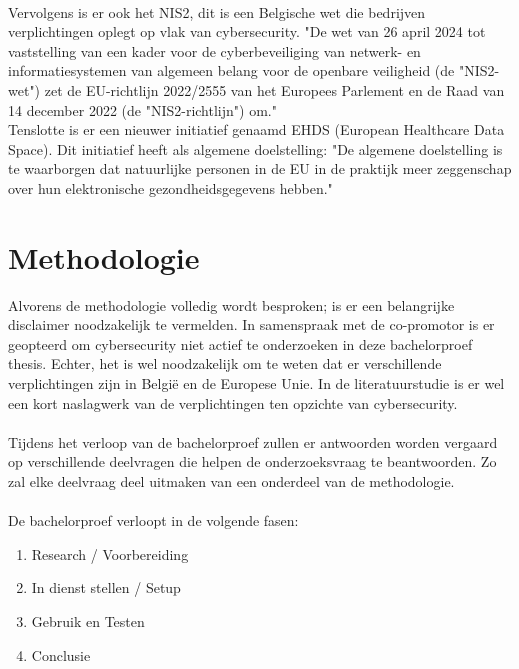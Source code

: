 \\
Vervolgens is er ook het NIS2, dit is een Belgische wet die bedrijven verplichtingen oplegt op vlak van cybersecurity. "De wet van 26 april 2024 tot vaststelling van een kader voor de cyberbeveiliging van netwerk- en informatiesystemen van algemeen belang voor de openbare veiligheid (de "NIS2-wet") zet de EU-richtlijn 2022/2555 van het Europees Parlement en de Raad van 14 december 2022 (de "NIS2-richtlijn") om." \autocite{Belgium2024}
\\
Tenslotte is er een nieuwer initiatief genaamd EHDS (European Healthcare Data Space). Dit initiatief heeft als algemene doelstelling: "De algemene doelstelling is te waarborgen dat natuurlijke personen in de EU in de praktijk meer zeggenschap over hun elektronische gezondheidsgegevens hebben." \autocite{EHDS2022}


\section{Methodologie}%
\label{sec:methodologie}

Alvorens de methodologie volledig wordt besproken; is er een belangrijke disclaimer noodzakelijk te vermelden.
In samenspraak met de co-promotor is er geopteerd om cybersecurity niet actief te onderzoeken in deze bachelorproef thesis. Echter, het is wel noodzakelijk om te weten dat er verschillende verplichtingen zijn in België en de Europese Unie. In de literatuurstudie is er wel een kort naslagwerk van de verplichtingen ten opzichte van cybersecurity.
\\\\
Tijdens het verloop van de bachelorproef zullen er antwoorden worden vergaard op verschillende deelvragen die helpen de onderzoeksvraag te beantwoorden. Zo zal elke deelvraag deel uitmaken van een onderdeel van de methodologie.
\\\\
De bachelorproef verloopt in de volgende fasen:

\begin{enumerate}
  \item Research / Voorbereiding
  \item In dienst stellen / Setup
  \item Gebruik en Testen
  \item Conclusie
\end{enumerate}

